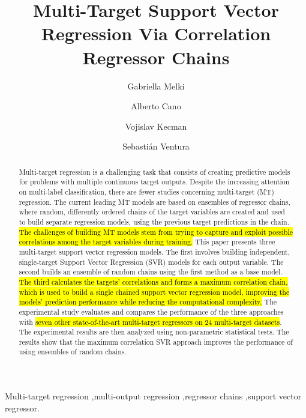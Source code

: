 \documentclass[preprint,12pt]{elsarticle}
\begin{document}
\begin{frontmatter}

\title{Multi-Target Support Vector Regression Via Correlation Regressor Chains}

\author[a]{Gabriella Melki}\author[a]{Alberto Cano}\author[a]{Vojislav Kecman}\author[b,c]{Sebasti\'an Ventura}

\address[a]{Department of Computer Science, Virginia Commonwealth University, USA}
\address[b]{Department of Computer Science and Numerical Analysis, University of Cordoba, Spain}
\address[c]{Department of Computer Science, King Abdulaziz University, Saudi Arabia Kingdom}

\begin{abstract}
Multi-target regression is a challenging task that consists of creating predictive models for problems with multiple continuous target outputs. Despite the increasing attention on multi-label classification, there are fewer studies concerning multi-target (MT) regression. The current leading MT models are based on ensembles of regressor chains, where random, differently ordered chains of the target variables are created and used to build separate regression models, using the previous target predictions in the chain. \hl{The challenges of building MT models stem from trying to capture and exploit possible correlations among the target variables during training.}
This paper presents three multi-target support vector regression models. The first involves building independent, single-target Support Vector Regression (SVR) models for each output variable. The second builds an ensemble of random chains using the first method as a base model. \hl{The third calculates the targets' correlations and forms a maximum correlation chain, which is used to build a single chained support vector regression model, improving the models' prediction performance while reducing the computational complexity.} The experimental study evaluates and compares the performance of the three approaches with \hl{seven other state-of-the-art multi-target regressors on $24$ multi-target datasets}. The experimental results are then analyzed using non-parametric statistical tests. The results show that the maximum correlation SVR approach improves the performance of using ensembles of random chains.
\end{abstract}

\begin{keyword}
Multi-target regression \sep multi-output regression \sep regressor chains \sep support vector regressor.
\end{keyword}

\end{frontmatter}
\end{document}
